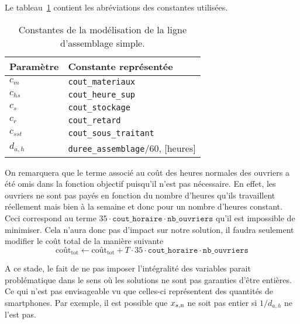 Le tableau~\ref{tab:constantesQuestion1} contient les abréviations
des constantes utilisées.
\begin{table}[h]
  \begin{center}
  \begin{tabular}{|l|l|}
    \hline
    Paramètre & Constante représentée \\
    \hline
    \hline
    $c_m$ & \texttt{cout\_materiaux} \\
    \hline
    $c_{hs}$ & \texttt{cout\_heure\_sup} \\
    \hline
    $c_s$ & \texttt{cout\_stockage} \\
    \hline
    $c_r$ & \texttt{cout\_retard} \\
    \hline
    $c_{sst}$ & \texttt{cout\_sous\_traitant} \\
    \hline
    $d_{a,h}$ & \texttt{duree\_assemblage}/60, [heures] \\
    \hline
  \end{tabular}
  \caption{Constantes de la modélisation de la ligne d'assemblage simple.}
  \label{tab:constantesQuestion1}
  \end{center}
\end{table}

On remarquera que le terme associé au coût des heures normales des ouvriers
a été omis dans la fonction objectif puisqu'il n'est pas nécessaire.
En effet, les ouvriers ne sont pas payés en fonction du nombre
d'heures qu'ils travaillent réellement mais bien à la semaine et
donc pour un nombre d'heures constant.
Ceci correspond au terme $35\cdot\texttt{cout\_horaire}\cdot
\texttt{nb\_ouvriers}$ qu'il est impossible de minimiser.
Cela n'aura donc pas d'impact sur notre solution,
il faudra seulement modifier le coût total de la manière suivante
\[ \text{coût}_\text{tot} \leftarrow \text{coût}_\text{tot} + T \cdot 35 \cdot\texttt{cout\_horaire}\cdot
\texttt{nb\_ouvriers} \]

A ce stade, le fait de ne pas imposer l'intégralité des variables
parait problématique dans le sens où les solutions ne sont pas 
garanties d'être entières. Ce qui n'est pas envisageable 
vu que celles-ci représentent des quantités de smartphones.
Par exemple, il est possible que
$x_{s,\text{n}}$ ne soit pas entier si $1/d_{a,h}$ ne l'est pas.

